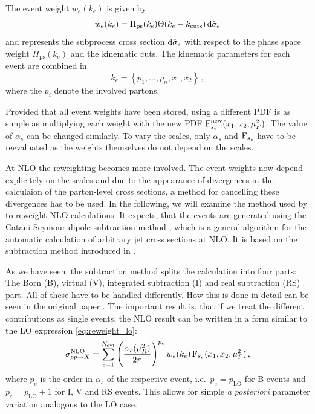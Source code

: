 %
The event weight $w_e(k_e)$ is given by
%
\begin{equation}
 	w_e(k_e) = \Pi_\text{ps}(k_e) \Theta(k_e - k_\text{cuts}) \dif \hat\sigma_e
\end{equation}
%
and represents the subprocess cross section $\dif \hat\sigma_e$ with respect to the phase space weight $\Pi_\text{ps}(k_e)$ and the kinematic cuts.
The kinematic parameters for each event are combined in
%
\begin{equation}
  k_e = \left\{ p_1 , \dots , p_n , x_1 , x_2 \right\} \, ,
\end{equation}
%
where the $p_i$ denote the involved partons.

Provided that all event weights have been stored, using a different PDF is as simple as multiplying each weight with the new PDF $\operatorname{F}^\text{new}_{s_e}(x_1,x_2,\mu_F^2)$.
The value of $\alpha_s$ can be changed similarly.
To vary the scales, only $\alpha_s$ and $\operatorname{F}_{s_e}$ have to be reevaluated as the weights themselves do not depend on the scales.

At NLO the reweighting becomes more involved.
The event weights now depend explicitely on the scales and due to the appearance of divergences in the calculaion of the parton-level cross sections, a method for cancelling these divergences has to be used.
In the following, we will examine the method used by \mcgrid{} to reweight NLO calculations.
It expects, that the events are generated using the Catani-Seymour dipole subtraction method \cite{catani_seymour1997}, which is a general algorithm for the automatic calculation of arbitrary jet cross sections at NLO.
It is based on the subtraction method introduced in .

As we have seen, the subtraction method splits the calculation into four parts: The Born (B), virtual (V), integrated subtraction (I) and real subtraction (RS) part.
All of these have to be handled differently.
How this is done in detail can be seen in the original \mcgrid{} paper \cite{mcgrid2013}.
The important result is, that if we treat the different contributions as single events, the NLO result can be written in a form similar to the LO expression \eqref{eq:reweight_lo}:
%
\begin{equation}
  \sigma^\text{NLO}_{pp \rightarrow X} = \sum_{e=1}^{N_\text{evt}} \left( \frac{\alpha_s(\mu_R^2)}{2 \pi} \right)^{p_e} w_e(k_e) \operatorname{F}_{s_e}(x_1,x_2,\mu_F^2) \, ,
  \label{eq:reweight_nlo}
\end{equation}
%
where $p_e$ is the order in $\alpha_s$ of the respective event, i.e.\ $p_e = p_\text{LO}$ for B events and $p_e = p_\text{LO} + 1$ for I, V and RS events.
This allows for simple \textit{a posteriori} parameter variation analogous to the LO case.
%
